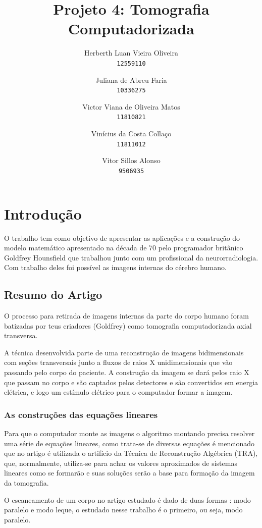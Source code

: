 \documentclass[a4paper, 12pt]{article}
\title{Projeto 4: Tomografia Computadorizada}
\author{
  Herberth Luan Vieira Oliveira\\
  \texttt{12559110}
  \and
  Juliana de Abreu Faria\\
  \texttt{10336275}
  \and
  Victor Viana de Oliveira Matos\\
  \texttt{11810821}
  \and
  Vinícius da Costa Collaço\\
  \texttt{11811012}
  \and
  Vitor Sillos Alonso\\
  \texttt{9506935}
}
\begin{document}
\maketitle

\section{Introdução}
    O trabalho tem como objetivo de apresentar as aplicações e a construção do modelo matemático apresentado na década de 70 pelo programador britânico Goldfrey Hounsfield que trabalhou junto com um profissional da neurorradiologia. Com trabalho deles foi possível as imagens internas do cérebro humano.
    
\subsection{Resumo do Artigo}
O processo para retirada de imagens internas da parte do corpo humano foram batizadas por teus criadores (Goldfrey) como tomografia computadorizada axial transversa.

A técnica desenvolvida parte de uma reconstrução de imagens bidimensionais com seções transversais  junto a fluxos de raios X unidimensionais que vão passando pelo corpo do paciente.
A construção da imagem se dará pelos raio X que passam no corpo e são captados pelos detectores e são convertidos em energia elétrica, e logo um estímulo elétrico para o computador formar a imagem.

\subsubsection{As construções das equações lineares}

Para que o computador monte as imagens o algoritmo montando precisa resolver uma série de equações lineares, como trata-se de diversas equações é mencionado que no artigo é utilizada o artifício da Técnica de Reconstrução Algébrica (TRA), que, normalmente, utiliza-se para achar os valores aproximados de sistemas lineares como se formarão e suas soluções serão a base para formação da imagem da tomografia.

O escaneamento de um corpo no artigo estudado é dado de duas formas : modo paralelo e modo leque, o estudado nesse trabalho é o primeiro, ou seja, modo paralelo.
\end{document}
